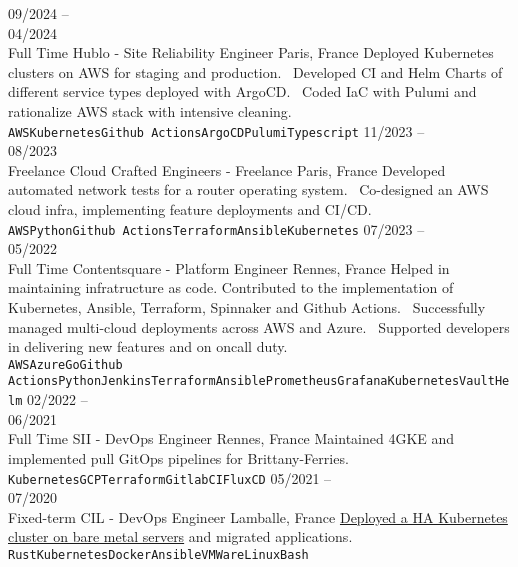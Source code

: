\documentclass[10pt]{developercv}
\begin{document}
\begin{entrylist}
	\entry
		{09/2024 --\\04/2024\\\footnotesize{Full Time}}
		{Hublo - Site Reliability Engineer}
		{Paris, France}
		{Deployed Kubernetes clusters on AWS for staging and production. \
		Developed CI and Helm Charts of different service types deployed with ArgoCD. \
		Coded IaC with Pulumi and rationalize AWS stack with intensive cleaning.\\
		\texttt{AWS}\slashsep\texttt{Kubernetes}\slashsep\texttt{Github Actions}\slashsep\texttt{ArgoCD}\slashsep\texttt{Pulumi}\slashsep\texttt{Typescript}}
	\entry
		{11/2023 --\\08/2023\\\footnotesize{Freelance}}
		{Cloud Crafted Engineers - Freelance}
		{Paris, France}
		{Developed automated network tests for a router operating system. \
		Co-designed an AWS cloud infra, implementing feature deployments and CI/CD.\\
		\texttt{AWS}\slashsep\texttt{Python}\slashsep\texttt{Github Actions}\slashsep\texttt{Terraform}\slashsep\texttt{Ansible}\slashsep\texttt{Kubernetes}}
	\entry
		{07/2023 --\\05/2022\\\footnotesize{Full Time}}
		{Contentsquare - Platform Engineer}
		{Rennes, France}
		{Helped in maintaining infratructure as code. Contributed to the implementation of Kubernetes, Ansible, Terraform, Spinnaker and Github Actions. \
		Successfully managed multi-cloud deployments across AWS and Azure. \
		Supported developers in delivering new features and on oncall duty.\\
		\texttt{AWS}\slashsep\texttt{Azure}\slashsep\texttt{Go}\slashsep\texttt{Github Actions}\slashsep\texttt{Python}\slashsep\texttt{Jenkins}\slashsep\texttt{Terraform}\slashsep\texttt{Ansible}\slashsep\texttt{Prometheus}\slashsep\texttt{Grafana}\slashsep\texttt{Kubernetes}\slashsep\texttt{Vault}\slashsep\texttt{Helm}}
	\entry
		{02/2022 --\\06/2021\\\footnotesize{Full Time}}
		{SII - DevOps Engineer}
		{Rennes, France}
		{Maintained 4GKE and implemented pull GitOps pipelines for Brittany-Ferries.\\
		\texttt{Kubernetes}\slashsep\texttt{GCP}\slashsep\texttt{Terraform}\slashsep\texttt{GitlabCI}\slashsep\texttt{FluxCD}}
	\entry
		{05/2021 --\\07/2020\\\footnotesize{Fixed-term}}
		{CIL - DevOps Engineer}
		{Lamballe, France}
		{\href{https://github.com/Ant0wan/VMWare-Kubenetes-cluster}{Deployed a HA Kubernetes cluster on bare metal servers} and migrated applications.\\
		\texttt{Rust}\slashsep\texttt{Kubernetes}\slashsep\texttt{Docker}\slashsep\texttt{Ansible}\slashsep\texttt{VMWare}\slashsep\texttt{Linux}\slashsep\texttt{Bash}}
\end{entrylist}
\end{document}
